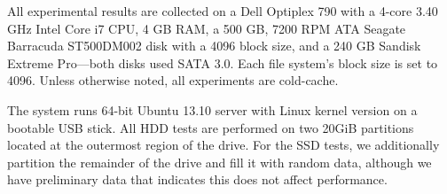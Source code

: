

All experimental results are collected on a Dell Optiplex 790 with a
4-core 3.40 GHz Intel Core i7 CPU, 4 GB RAM, a 500 GB, 7200 RPM ATA
Seagate Barracuda ST500DM002 disk with a \unit{4096}\byte{} block size, and a 240 GB Sandisk
Extreme Pro---both disks used SATA 3.0.  Each file system's block size
is set to \unit{4096}\byte{}.
Unless otherwise noted, all experiments are cold-cache.

The system runs 64-bit Ubuntu 13.10 server with Linux kernel version
\linuxver{} on a bootable USB stick.  All HDD tests are performed on two 20GiB
partitions located at the outermost region of the drive.
For the SSD tests, we additionally partition the remainder of the drive and
fill it with random data, although we have preliminary data that indicates this
does not affect performance.
